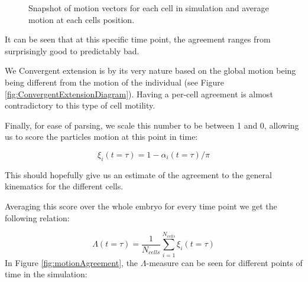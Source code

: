 \begin{figure}[H]
    \centering
    \caption{Snapshot of motion vectors for each cell in simulation and average motion at each cells position. }
    \label{fig:motionAgreementExample}
\end{figure}


It can be seen that at this specific time point, the agreement ranges from surprisingly good to predictably bad. 

We Convergent extension is by its very nature based on the global motion being being different from the motion of the individual (see Figure \ref{fig:ConvergentExtensionDiagram}). Having a per-cell agreement is almost contradictory to this type of cell motility. 





Finally, for ease of parsing, we scale this number to be between 1 and 0, allowing us to score the particles motion at this point in time:

\begin{equation}
    \xi_i(t=\tau) = 1-\alpha_i(t=\tau)/\pi
\end{equation}

This should hopefully give us an estimate of the agreement to the general kinematics for the different cells.


Averaging this score over the whole embryo for every time point we get the following relation:

\begin{equation}
     \Lambda(t=\tau) = \frac{1}{N_{cells}} \sum_{i=1}^{N_{cells}}\xi_i(t=\tau)
\end{equation}
In Figure \ref{fig:motionAgreement}, the $ \Lambda$-measure can be seen for different points of time in the simulation:

